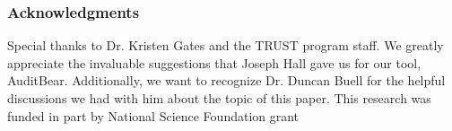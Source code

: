 \subsubsection{Acknowledgments}
Special thanks to Dr. Kristen Gates and the TRUST
program staff.  We greatly appreciate the invaluable suggestions that Joseph
Hall gave us for our tool, AuditBear.  Additionally, we want to recognize
Dr. Duncan Buell for the helpful discussions we had with him about the topic of
this paper. This research was funded in part by National Science Foundation
grant 
